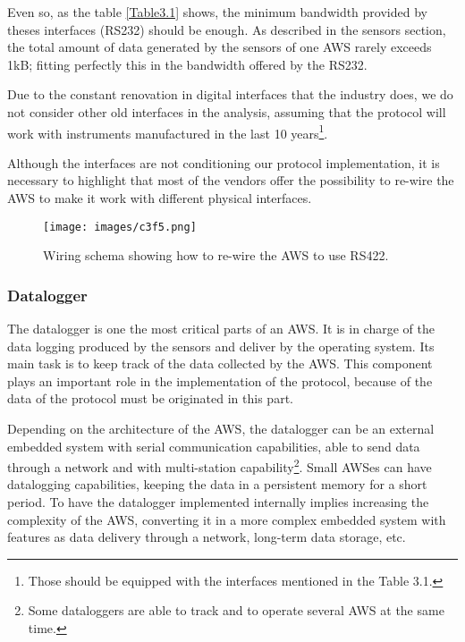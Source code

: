 {Even so, as the table \ref{Table3.1} shows, the minimum bandwidth provided by theses interfaces (\gls{RS232}) should be enough. As described in the sensors section, the total amount of data generated by the sensors of one \gls{AWS} rarely exceeds 1\gls{kB}; fitting perfectly this in the bandwidth offered by the \gls{RS232}.

Due to the constant renovation in digital interfaces that the industry does, we do not consider other old interfaces in the analysis, assuming that the protocol will work with instruments manufactured in the last 10 years\footnote{Those should be equipped with the interfaces mentioned in the Table 3.1.}.

Although the interfaces are not conditioning our protocol implementation, it is necessary to highlight that most of the vendors offer the possibility to re-wire the \gls{AWS} to make it work with different physical interfaces.

\begin{figure}[H]
\centerline{\texttt{[image: images/c3f5.png]}}
\caption{Wiring schema showing how to re-wire the \protect \gls{AWS} to use \protect \gls{RS422}.}
\end{figure}


\subsubsection{Datalogger}\label{dataloggersection}

The datalogger is one the most critical parts of an \gls{AWS}. It is in charge of the data logging produced by the sensors and deliver by the operating system. Its main task is to keep track of the data collected by the \gls{AWS}. This component plays an important role in the implementation of the protocol, because of the data of the protocol must be originated in this part.

Depending on the architecture of the \gls{AWS}, the datalogger can be an external embedded system with serial communication capabilities, able to send data through a network and with multi-station capability\footnote{Some dataloggers are able to track and to operate several \gls{AWS} at the same time.}. Small \gls{AWS}es can have datalogging capabilities, keeping the data in a persistent memory for a short period. To have the datalogger implemented internally implies increasing the complexity of the \gls{AWS}, converting it in a more complex embedded system with features as data delivery through a network, long-term data storage, etc.

}
